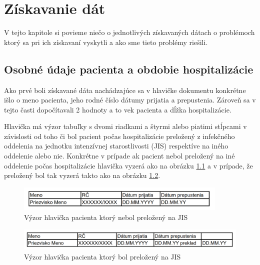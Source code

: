 \chapter{Získavanie dát}

V tejto kapitole si povieme niečo o jednotlivých získavaných dátach o problémoch ktorý sa pri ich získavaní vyskytli a ako sme tieto problémy riešili.

\section{Osobné údaje pacienta a obdobie hospitalizácie}
\label{osobUdaj}
Ako prvé boli získavané dáta nachádzajúce sa v hlavičke dokumentu konkrétne išlo o meno pacienta, jeho rodné číslo dátumy prijatia a prepustenia. Zároveň sa v tejto časti dopočítavali 2 hodnoty a to vek pacienta a dĺžka hospitalizácie.

Hlavička má výzor tabuľky s dvomi riadkami a štyrmi alebo piatimi stĺpcami v závislosti od toho či bol pacient počas hospitalizácie preložený z infekčného oddelenia na jednotku intenzívnej starostlivosti (JIS) respektíve na iného oddelenie alebo nie. Konkrétne v prípade ak pacient nebol preložený na iné oddelenie počas hospitalizácie hlavička vyzerá ako na obrázku \ref{obr:hlav_a} a v prípade, že preložený bol tak vyzerá takto ako na obrázku \ref{obr:hlav_b}.  

\begin{figure}
	\centerline{\includegraphics[width=0.9\textwidth]{images/hlavicka_a}}
	\caption[Hlavička a)]{Výzor hlavička pacienta ktorý nebol preložený na JIS}
	\label{obr:hlav_a}
\end{figure}

\begin{figure}
	\centerline{\includegraphics[width=1\textwidth]{images/hlavicka_b}}
	\caption[Hlavička b)]{Výzor hlavička pacienta ktorý bol preložený na JIS}
	\label{obr:hlav_b}
\end{figure}


